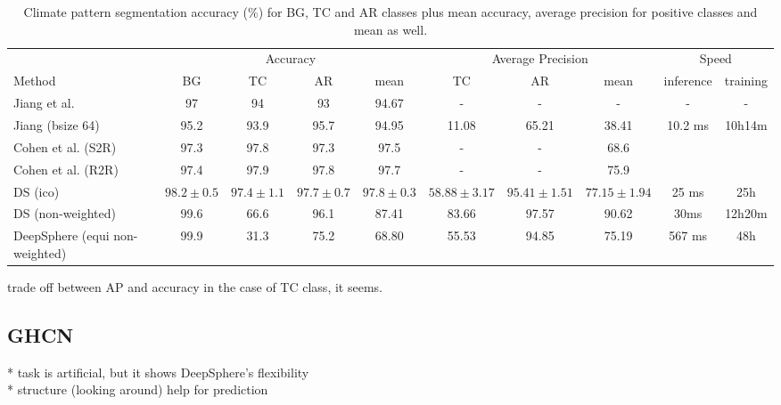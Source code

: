\documentclass{article} %
\begin{document}
\begin{table}[!ht]
\begin{tabular}{l|c c c c c c c c c}
        \multicolumn{1}{l}{} & \multicolumn{4}{c}{Accuracy} & \multicolumn{3}{c}{Average Precision} & \multicolumn{2}{c}{Speed}\\
        \cmidrule(lr){2-5}\cmidrule(lr){6-8}\cmidrule(lr){9-10}
        \multicolumn{1}{l}{Method} & BG & TC & AR & mean & TC & AR & mean & inference & training \\ \hline
        Jiang et al. & 97 & 94 & 93 & 94.67 & - & - & - & - & -\\
        Jiang (bsize 64) & 95.2 & 93.9 & 95.7 & 94.95 & 11.08 & 65.21 & 38.41 & 10.2 ms & 10h14m\\
        Cohen et al. (S2R) & 97.3 & 97.8 & 97.3 & 97.5 & - & -& 68.6\\
        Cohen et al. (R2R) & 97.4 & 97.9 & 97.8 & 97.7 & - & -& 75.9\\ \hline
        DS (ico) & $98.2\pm 0.5$ & $97.4\pm 1.1$ & $97.7\pm 0.7$ & $97.8\pm 0.3$ & $58.88\pm 3.17$ & $95.41\pm 1.51$ & $77.15\pm 1.94$ & 25 ms & 25h \\
        DS (non-weighted) & 99.6 & 66.6 & 96.1 & 87.41 & 83.66 & 97.57 & 90.62 & 30ms & 12h20m\\ \hline
        DeepSphere (equi non-weighted) & 99.9 & 31.3 & 75.2 & 68.80 & 55.53 & 94.85 & 75.19 & 567 ms & 48h
    \end{tabular}
    \caption{Climate pattern segmentation accuracy (\%) for BG, TC
and AR classes plus mean accuracy, average precision for positive classes and mean as well.}
\end{table}

trade off between AP and accuracy in the case of TC class, it seems.

\subsection{GHCN}

* task is artificial, but it shows DeepSphere's flexibility\\
* structure (looking around) help for prediction\\
\end{document}
